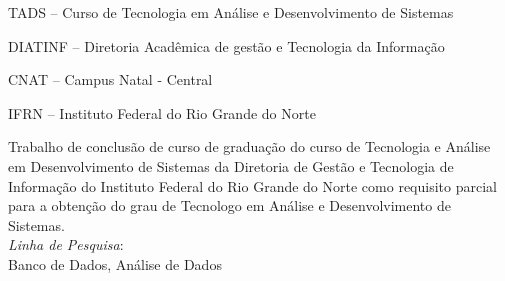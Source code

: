 
\titulo{\Large{\thesistitle}}
\autor{\thesisauthor}
\orientador[Orientador]{\par \thesissupervisor}
\instituicao
{
	TADS -- Curso de Tecnologia em Análise e Desenvolvimento de
	Sistemas\par
	DIATINF -- Diretoria Acadêmica de gestão e Tecnologia da Informação\par
	CNAT -- Campus Natal - Central\par
	IFRN -- Instituto Federal do Rio Grande do Norte }

\comentario
{
	Trabalho de conclusão de curso de graduação do curso de Tecnologia e Análise em
	Desenvolvimento de Sistemas da Diretoria de Gestão e Tecnologia de Informação
	do Instituto Federal do Rio Grande do Norte como requisito parcial para a
	obtenção do grau de Tecnologo em Análise e Desenvolvimento de
	Sistemas.\bigskip\\
	\textit{Linha de Pesquisa}:\\Banco de Dados, Análise de Dados
}


\folhaderosto